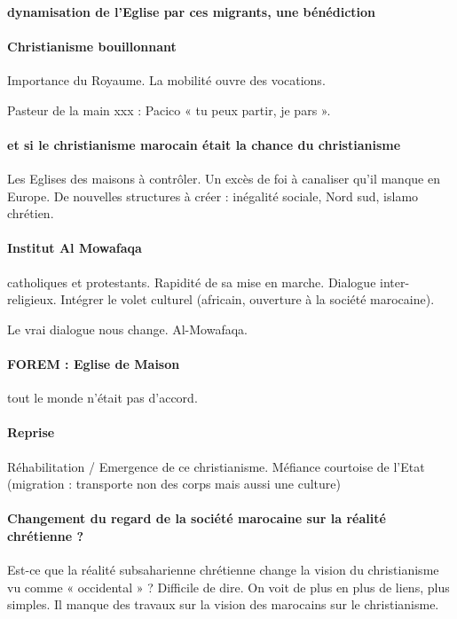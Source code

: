 \paragraph{dynamisation de l’Eglise par ces migrants, une bénédiction}
\paragraph{Christianisme bouillonnant} Importance du Royaume. La mobilité ouvre des vocations. 
\begin{Ex}
Pasteur de la main xxx : Pacico « tu peux partir, je pars ». 
\end{Ex}
\paragraph{et si le christianisme marocain était la chance du christianisme} Les Eglises des maisons à contrôler.  Un excès de foi à canaliser qu’il manque en Europe. De nouvelles structures à créer : inégalité sociale,  Nord sud, islamo chrétien. 

\paragraph{Institut Al Mowafaqa} catholiques et protestants. Rapidité de sa mise en marche.  Dialogue inter-religieux. Intégrer le volet culturel (africain, ouverture à la société marocaine).
\begin{Synthesis}
Le vrai dialogue nous change. Al-Mowafaqa. 
\end{Synthesis} 

\paragraph{FOREM : Eglise de Maison} tout le monde n’était pas d’accord.

\paragraph{Reprise}
Réhabilitation / Emergence de ce christianisme. Méfiance courtoise de l’Etat (migration : transporte non des corps mais aussi une culture)

\paragraph{Changement du regard de la société marocaine sur la réalité chrétienne ?} Est-ce que la réalité subsaharienne chrétienne change la vision du christianisme vu comme « occidental » ? Difficile de dire.  On voit de plus en plus de liens, plus simples. Il manque des travaux sur la vision des marocains sur le christianisme. 		

